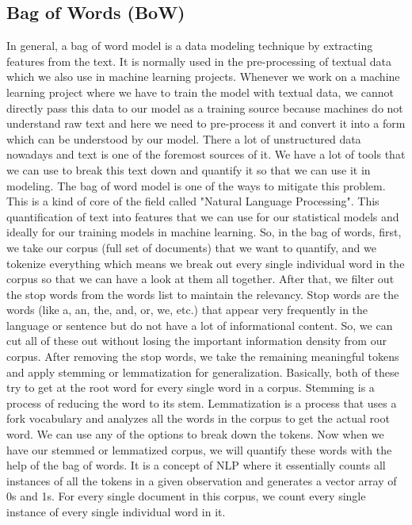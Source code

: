 \subsection{Bag of Words (BoW)}
In general, a bag of word model is a data modeling technique by extracting features from the text. It is normally used in the pre-processing of textual data which we also use in machine learning projects. Whenever we work on a machine learning project where we have to train the model with textual data, we cannot directly pass this data to our model as a training source because machines do not understand raw text and here we need to pre-process it and convert it into a form which can be understood by our model. There a lot of unstructured data nowadays and text is one of the foremost sources of it. We have a lot of tools that we can use to break this text down and quantify it so that we can use it in modeling. The bag of word model is one of the ways to mitigate this problem. This is a kind of core of the field called "Natural Language Processing". This quantification of text into features that we can use for our statistical models and ideally for our training models in machine learning. So, in the bag of words, first, we take our corpus (full set of documents) that we want to quantify, and we tokenize everything which means we break out every single individual word in the corpus so that we can have a look at them all together. After that, we filter out the stop words from the words list to maintain the relevancy. Stop words are the words (like a, an, the, and, or, we, etc.) that appear very frequently in the language or sentence but do not have a lot of informational content. So, we can cut all of these out without losing the important information density from our corpus. After removing the stop words, we take the remaining meaningful tokens and apply stemming or lemmatization for generalization. Basically, both of these try to get at the root word for every single word in a corpus.  Stemming is a process of reducing the word to its stem. Lemmatization is a process that uses a fork vocabulary and analyzes all the words in the corpus to get the actual root word. We can use any of the options to break down the tokens. Now when we have our stemmed or lemmatized corpus, we will quantify these words with the help of the bag of words. It is a concept of NLP where it essentially counts all instances of all the tokens in a given observation and generates a vector array of 0s and 1s. For every single document in this corpus, we count every single instance of every single individual word in it. 
